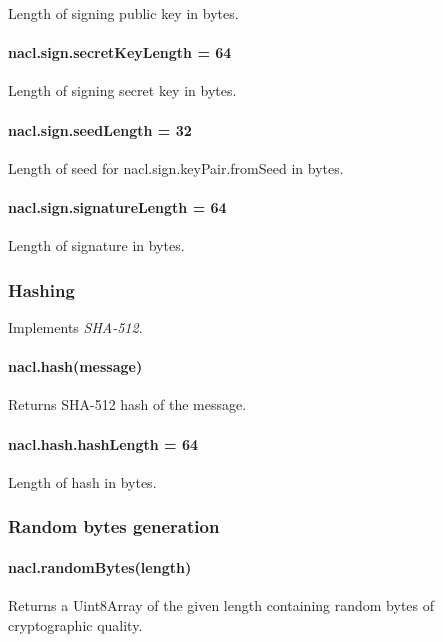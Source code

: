 Length of signing public key in bytes.

\paragraph*{nacl.\+sign.\+secret\+Key\+Length = 64}

Length of signing secret key in bytes.

\paragraph*{nacl.\+sign.\+seed\+Length = 32}

Length of seed for {\ttfamily nacl.\+sign.\+key\+Pair.\+from\+Seed} in bytes.

\paragraph*{nacl.\+sign.\+signature\+Length = 64}

Length of signature in bytes.

\subsubsection*{Hashing}

Implements {\itshape S\+H\+A-\/512}.

\paragraph*{nacl.\+hash(message)}

Returns S\+H\+A-\/512 hash of the message.

\paragraph*{nacl.\+hash.\+hash\+Length = 64}

Length of hash in bytes.

\subsubsection*{Random bytes generation}

\paragraph*{nacl.\+random\+Bytes(length)}

Returns a {\ttfamily Uint8\+Array} of the given length containing random bytes of cryptographic quality.

